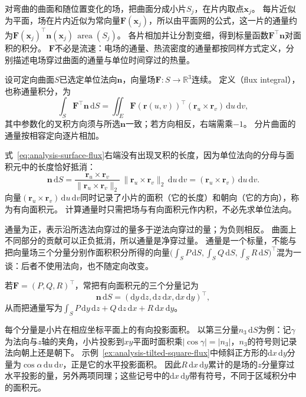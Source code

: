 对弯曲的曲面和随位置变化的场，把曲面分成小片$S_j$，在片内取点$\bm x_j$。
每片近似为平面，场在片内近似为常向量$\bm F(\bm x_j)$，所以由平面网的公式，这一片的通量约为$\bm F(\bm x_j)^\top\bm n(\bm x_j)\,\operatorname{area}(S_j)$。
各片相加并让分割变细，得到标量函数$\bm F^\top\bm n$对面积的积分。
$\bm F$不必是流速：电场的通量、热流密度的通量都按同样方式定义，分别描述电场穿过曲面的通量与单位时间穿过的热量。

\begin{definition}[第二类曲面积分]
\label{def:analysis-surface-flux-integral}
设可定向曲面$S$已选定单位法向$\bm n$，向量场$\bm F:S\to\mathbb R^3$连续。
定义（flux integral），也称通量积分，为
\begin{equation}
 \int_S\bm F^\top\bm n\,\mathrm dS
 =\iint_E\bm F(\bm r(u,v))^\top(\bm r_u\times\bm r_v)\,\mathrm du\,\mathrm dv,
 \label{eq:analysis-surface-flux}
\end{equation}
其中参数化的叉积方向须与所选$\bm n$一致；若方向相反，右端需乘$-1$。
分片曲面的通量按相容定向逐片相加。
\end{definition}

式~\eqref{eq:analysis-surface-flux}右端没有出现叉积的长度，因为单位法向的分母与面积元中的长度恰好抵消：
\[
 \bm n\,\mathrm dS
 =\frac{\bm r_u\times\bm r_v}{\lVert\bm r_u\times\bm r_v\rVert_2}\,\lVert\bm r_u\times\bm r_v\rVert_2\,\mathrm du\,\mathrm dv
 =(\bm r_u\times\bm r_v)\,\mathrm du\,\mathrm dv.
\]
向量$(\bm r_u\times\bm r_v)\,\mathrm du\,\mathrm dv$同时记录了小片的面积（它的长度）和朝向（它的方向），称为有向面积元。
计算通量时只需把场与有向面积元作内积，不必先求单位法向。

通量为正，表示沿所选法向穿过的量多于逆法向穿过的量；为负则相反。
曲面上不同部分的贡献可以正负抵消，所以通量是净穿过量。
通量是一个标量，不能与把向量场三个分量分别作面积积分所得的向量$\bigl(\int_SP\,\mathrm dS,\int_SQ\,\mathrm dS,\int_SR\,\mathrm dS\bigr)^\top$混为一谈：后者不使用法向，也不随定向改变。

若$\bm F=(P,Q,R)^\top$，常把有向面积元的三个分量记为
\[
 \bm n\,\mathrm dS=(\mathrm dy\,\mathrm dz,\mathrm dz\,\mathrm dx,\mathrm dx\,\mathrm dy)^\top,
\]
从而把通量写为$\int_SP\,\mathrm dy\,\mathrm dz+Q\,\mathrm dz\,\mathrm dx+R\,\mathrm dx\,\mathrm dy$。

每个分量是小片在相应坐标平面上的有向投影面积。
以第三分量$n_3\,\mathrm dS$为例：记$\gamma$为法向与$z$轴的夹角，小片投影到$xy$平面时面积乘$|\cos\gamma|=|n_3|$，$n_3$的符号则记录法向朝上还是朝下。
示例~\ref{ex:analysis-tilted-square-flux}中倾斜正方形的$\mathrm dx\,\mathrm dy$分量为$\cos\alpha\,\mathrm du\,\mathrm dv$，正是它的水平投影面积。
因此$R\,\mathrm dx\,\mathrm dy$累计的是场的$z$分量穿过水平投影的量，另外两项同理；这些记号中的$\mathrm dx\,\mathrm dy$带有符号，不同于区域积分中的面积元。

